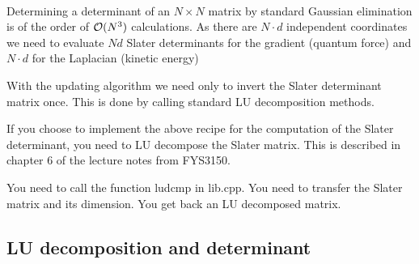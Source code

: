 \documentclass[%
twoside,                 %
final,                   %
10pt]{article}
\begin{document}
\paragraph{}
Determining a determinant of an $N \times N$ matrix by
standard Gaussian elimination is of the order of ${\cal O}(N^3)$
calculations. As there are $N\cdot d$ independent coordinates we need
to evaluate $Nd$ Slater determinants for the gradient (quantum force) and
$N\cdot d$ for the Laplacian (kinetic energy)

With the updating algorithm we need only to invert the Slater determinant matrix once.
This is done by calling standard LU decomposition methods.


If you choose to implement the above recipe for the computation of the Slater determinant,
you need to LU decompose the Slater matrix. This is described in chapter 6 of the lecture notes 
from FYS3150.

You need to call the function ludcmp in lib.cpp.
You need to transfer the Slater matrix and its dimension. You get back an LU decomposed matrix.



\subsection*{LU decomposition and determinant}

\end{document}
